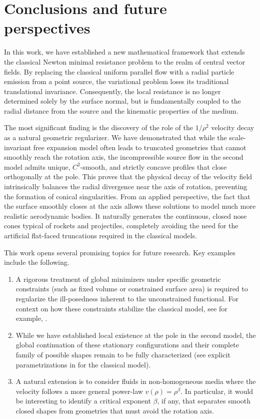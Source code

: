 \documentclass[a4paper,12pt]{amsart}
\theoremstyle{plain}
\theoremstyle{definition}
\begin{document}
 
\section{Conclusions and future perspectives}\label{s5}
 
In this work, we have established a new mathematical framework that extends the classical Newton minimal resistance problem to the realm of central vector fields. By replacing the classical uniform parallel flow with a radial particle emission from a point source, the variational problem loses its traditional translational invariance. Consequently, the local resistance is no longer determined solely by the surface normal, but is fundamentally coupled to the radial distance from the source and the kinematic properties of the medium.

The most significant finding is the discovery of the role of the $1/\rho^2$ velocity decay as a natural geometric regularizer. We have demonstrated that while the scale-invariant free expansion model often leads to truncated geometries that cannot smoothly reach the rotation axis, the incompressible source flow in the second model admits unique, $C^2$-smooth, and strictly concave profiles that close orthogonally at the pole. This proves that the physical decay of the velocity field intrinsically balances the radial divergence near the axis of rotation, preventing the formation of conical singularities.  From an applied perspective, the fact that the surface smoothly closes at the axis allows these solutions to model much more realistic aerodynamic bodies. It naturally generates the continuous, closed nose cones typical of rockets and projectiles, completely avoiding the need for the artificial flat-faced truncations required in the classical models.

This work opens several promising  topics for future research. Key examples include the following.
\begin{enumerate}
\item A rigorous treatment of global minimizers under specific geometric constraints (such as fixed volume or constrained surface area) is required to regularize the ill-posedness inherent to the unconstrained functional. For context on how these constraints stabilize the classical model, see for example, \cite{bw,wa}.
 \item While we have established local existence at the pole in the second model, the global continuation of these stationary configurations and their complete family of possible shapes remain to be fully characterized (see explicit parametrizations in \cite{go} for the classical model).
 \item A natural extension is to consider fluids in non-homogeneous media where the velocity follows a more general power-law $v(\rho)= \rho^\beta$. In particular, it would be interesting to identify a critical exponent $\beta$, if any, that separates smooth closed shapes from geometries that must avoid the rotation axis. 
 \end{enumerate}
 
\end{document}
